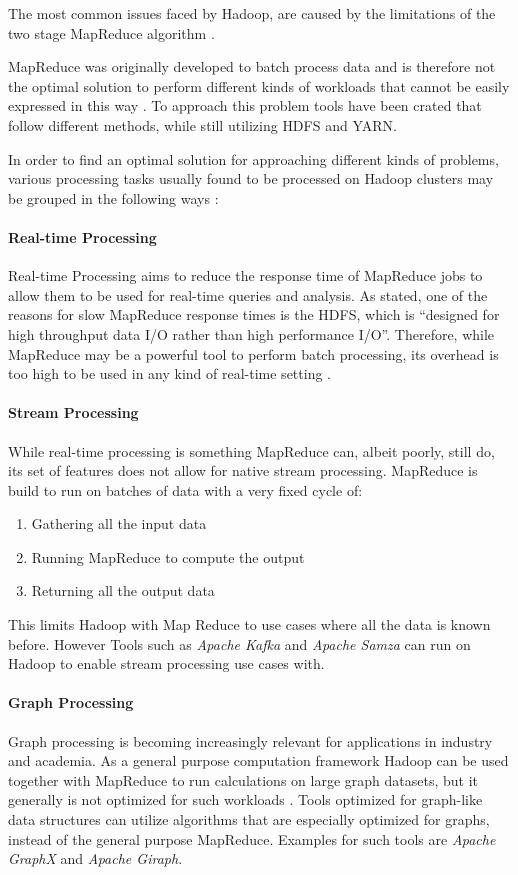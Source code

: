 The most common issues faced by Hadoop, are caused by the limitations of the two stage MapReduce algorithm \autocite[][]{6903263}. 

MapReduce was originally developed to batch process data and is
therefore not the optimal solution to perform different kinds of
workloads that cannot be easily expressed in this
way \autocite{computers3040117}.
To approach this problem tools have been crated that follow different methods, while still utilizing \ac{HDFS} and \ac{YARN}.

In order to find an optimal solution for approaching different kinds of problems, various processing tasks usually found to be processed on Hadoop clusters may be grouped in the following ways \autocite{computers3040117}:

\paragraph{Real-time Processing}
Real-time Processing aims to reduce the response time of MapReduce jobs to allow them to be used for real-time queries and analysis. As \textcite{computers3040117} stated, one of the reasons for slow MapReduce response times is the \ac{HDFS}, which is \enquote{designed for high throughput data I/O rather than high performance I/O}.
Therefore, while MapReduce may be a powerful tool to perform batch processing, its overhead is too high to be used in any kind of real-time setting \autocite{computers3040117}.

\paragraph{Stream Processing}
While real-time processing is something MapReduce can, albeit poorly, still do, its set of features does not allow for native stream processing. MapReduce is build to run on batches of data with a very fixed cycle of:
\begin{enumerate}
    \item Gathering all the input data
    \item Running MapReduce to compute the output
    \item Returning all the output data
\end{enumerate}
This limits Hadoop with Map Reduce to use cases where all the data is known before.
However Tools such as \emph{Apache Kafka} and \emph{Apache Samza} can run on Hadoop to enable stream processing use cases with.

\paragraph{Graph Processing}
Graph processing is becoming increasingly relevant for
applications in industry and academia. 
As a general purpose computation framework Hadoop 
can be used together with MapReduce to run calculations 
on large graph datasets, 
but it generally is not optimized for such workloads \autocite[][]{Capota:2015:GBD:2764947.2764954}. 
Tools optimized for graph-like data structures can utilize algorithms that are especially optimized for graphs, instead of the general purpose MapReduce.
Examples for such tools are \emph{Apache GraphX} and \emph{Apache Giraph}.

